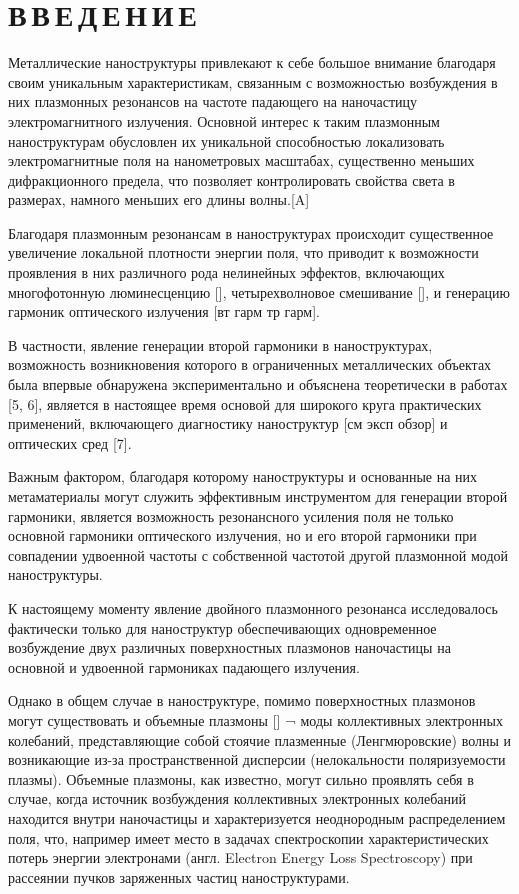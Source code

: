 \documentclass[12pt, a4paper]{article}
\begin{document}
\section*{В\,В\,Е\,Д\,Е\,Н\,И\,Е}

Металлические наноструктуры привлекают к себе большое внимание благодаря своим уникальным характеристикам, связанным с возможностью возбуждения в них плазмонных резонансов на частоте падающего на наночастицу электромагнитного излучения.
Основной интерес к таким плазмонным наноструктурам обусловлен их уникальной способностью локализовать электромагнитные поля на нанометровых масштабах, существенно меньших дифракционного предела, что позволяет контролировать свойства света в размерах, намного меньших его длины волны.[A]

Благодаря плазмонным резонансам в наноструктурах происходит существенное увеличение локальной плотности энергии поля, что приводит к возможности проявления в них различного рода нелинейных эффектов, включающих многофотонную люминесценцию [], четырехволновое смешивание [], и генерацию гармоник оптического излучения [вт гарм тр гарм].

В частности, явление генерации второй гармоники в наноструктурах, возможность возникновения которого в ограниченных металлических объектах была впервые обнаружена экспериментально и объяснена теоретически в работах [5, 6], является в настоящее время основой для широкого круга практических применений, включающего диагностику наноструктур [см эксп обзор] и оптических сред [7].

Важным фактором, благодаря которому наноструктуры и основанные на них метаматериалы могут служить эффективным инструментом для генерации второй гармоники, является возможность резонансного усиления поля не только основной гармоники оптического излучения, но и его второй гармоники при совпадении удвоенной частоты с собственной частотой другой плазмонной модой наноструктуры. 

К настоящему моменту явление двойного плазмонного резонанса исследовалось фактически только для наноструктур обеспечивающих одновременное возбуждение двух различных поверхностных плазмонов наночастицы на основной и удвоенной гармониках падающего излучения.

Однако в общем случае в наноструктуре, помимо поверхностных плазмонов могут существовать и объемные плазмоны [] ¬ моды коллективных электронных колебаний, представляющие собой стоячие плазменные (Ленгмюровские) волны и возникающие из-за пространственной дисперсии (нелокальности поляризуемости плазмы). Объемные плазмоны, как известно, могут сильно проявлять себя в случае, когда источник возбуждения коллективных электронных колебаний находится внутри наночастицы и характеризуется неоднородным распределением поля, что, например имеет место в задачах спектроскопии характеристических потерь энергии электронами (англ. Electron Energy Loss Spectroscopy) при рассеянии пучков заряженных частиц наноструктурами. 
\end{document}

